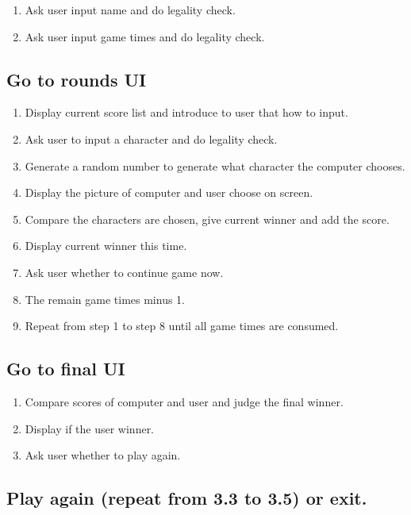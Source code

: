 \documentclass[12pt]{article}
\begin{document}
		\begin{enumerate}
			\item Ask user input name and do legality check.
			\item Ask user input game times and do legality check.
		\end{enumerate}
		
	\subsection{Go to rounds UI}
		
		\begin{enumerate}
			\item Display current score list and introduce to user that how to input.
			\item Ask user to input a character and do legality check.
			\item Generate a random number to generate what character the computer chooses.
			\item Display the picture of computer and user choose on screen.
			\item Compare the characters are chosen, give current winner and add the score.
			\item Display current winner this time.
			\item Ask user whether to continue game now.
			\item The remain game times minus 1.
			\item Repeat from step 1 to step 8 until all game times are consumed.
		\end{enumerate}
		
	\subsection{Go to final UI}
		
		\begin{enumerate}
			\item Compare scores of computer and user and judge the final winner.
			\item Display if the user winner.
			\item Ask user whether to play again.
		\end{enumerate}
		
	\subsection{Play again (repeat from 3.3 to 3.5) or exit.}
	
\end{document}
